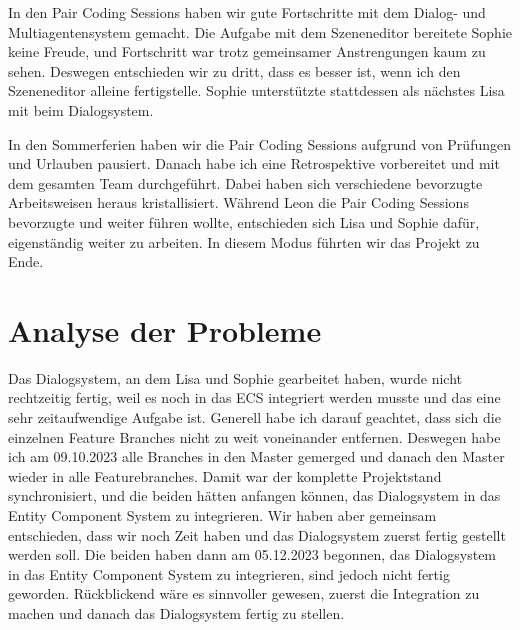 In den Pair Coding Sessions haben wir gute Fortschritte mit dem Dialog- und Multiagentensystem gemacht. Die Aufgabe mit dem Szeneneditor bereitete Sophie keine Freude, und Fortschritt war trotz gemeinsamer Anstrengungen kaum zu sehen. Deswegen entschieden wir zu dritt, dass es besser ist, wenn ich den Szeneneditor alleine fertigstelle. Sophie unterstützte stattdessen als nächstes Lisa mit beim Dialogsystem.

In den Sommerferien haben wir die Pair Coding Sessions aufgrund von Prüfungen und Urlauben pausiert. Danach habe ich eine Retrospektive vorbereitet und mit dem gesamten Team durchgeführt. Dabei haben sich verschiedene bevorzugte Arbeitsweisen heraus kristallisiert. Während Leon die Pair Coding Sessions bevorzugte und weiter führen wollte, entschieden sich Lisa und Sophie dafür, eigenständig weiter zu arbeiten. In diesem Modus führten wir das Projekt zu Ende.

\section{Analyse der Probleme}

Das Dialogsystem, an dem Lisa und Sophie gearbeitet haben, wurde nicht rechtzeitig fertig, weil es noch in das ECS integriert werden musste und das eine sehr zeitaufwendige Aufgabe ist. Generell habe ich darauf geachtet, dass sich die einzelnen Feature Branches nicht zu weit voneinander entfernen. Deswegen habe ich am 09.10.2023 alle Branches in den Master gemerged und danach den Master wieder in alle Featurebranches. Damit war der komplette Projektstand synchronisiert, und die beiden hätten anfangen können, das Dialogsystem in das Entity Component System zu integrieren. Wir haben aber gemeinsam entschieden, dass wir noch Zeit haben und das Dialogsystem zuerst fertig gestellt werden soll. Die beiden haben dann am 05.12.2023 begonnen, das Dialogsystem in das Entity Component System zu integrieren, sind jedoch nicht fertig geworden. Rückblickend wäre es sinnvoller gewesen, zuerst die Integration zu machen und danach das Dialogsystem fertig zu stellen.

